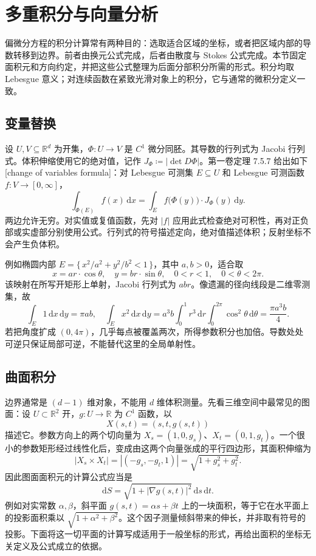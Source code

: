 \section{多重积分与向量分析}
\label{b2:sec:0102}

偏微分方程的积分计算常有两种目的：选取适合区域的坐标，或者把区域内部的导数转移到边界。前者由换元公式完成，后者由散度与 Stokes 公式完成。本节固定面积元和方向约定，并把这些公式整理为后面分部积分所需的形式。积分均取 Lebesgue 意义；对连续函数在紧致光滑对象上的积分，它与通常的微积分定义一致。

\subsection{变量替换}
\label{b2:subsec:010201}

设 \(U,V\subseteq\mathbb R^d\) 为开集，\(\Phi:U\rightarrow V\) 是 \(C^1\) 微分同胚。其导数的行列式为 Jacobi 行列式。体积伸缩使用它的绝对值，记作 \(J_\Phi\coloneqq|\det D\Phi|\)。第一卷定理 7.5.7 给出如下[change of variables formula]：对 Lebesgue 可测集 \(E\subseteq U\) 和 Lebesgue 可测函数 \(f:V\to[0,\infty]\)，
\[
 \int_{\Phi(E)}f(x)\,\mathrm dx
 =\int_E f\bigl(\Phi(y)\bigr)\cdot J_\Phi(y)\,\mathrm dy.
\]
两边允许无穷。对实值或复值函数，先对 \(|f|\) 应用此式检查绝对可积性，再对正负部或实虚部分别使用公式。行列式的符号描述定向，绝对值描述体积；反射坐标不会产生负体积。

\ProseParagraphBreak

例如椭圆内部 \(E=\{\,x^2/a^2+y^2/b^2<1\,\}\)，其中 \(a,b>0\)，适合取
\[
 x=ar\cdot\cos\theta,\quad y=br\cdot\sin\theta,
 \quad 0<r<1,\quad 0<\theta<2\pi.
\]
该映射在所写开矩形上单射，Jacobi 行列式为 \(abr\)。像遗漏的径向线段是二维零测集，故
\[
 \int_E1\,\mathrm dx\,\mathrm dy=\pi ab,
 \quad
 \int_E x^2\,\mathrm dx\,\mathrm dy
 =a^3b\int_0^1r^3\,\mathrm dr\int_0^{2\pi}\cos^2\theta\,\mathrm d\theta
 =\frac{\pi a^3b}{4}.
\]
若把角度扩成 \((0,4\pi)\)，几乎每点被覆盖两次，所得参数积分也加倍。导数处处可逆只保证局部可逆，不能替代这里的全局单射性。

\subsection{曲面积分}
\label{b2:subsec:010202}

边界通常是 \((d-1)\) 维对象，不能用 \(d\) 维体积测量。先看三维空间中最常见的图面：设 \(U\subset\mathbb R^2\) 开，\(g:U\to\mathbb R\) 为 \(C^1\) 函数，以
\[
 X(s,t)=(s,t,g(s,t))
\]
描述它。参数方向上的两个切向量为 \(X_s=(1,0,g_s)\)、\(X_t=(0,1,g_t)\)。一个很小的参数矩形经过线性化后，变成由这两个向量张成的平行四边形，其面积伸缩为
\[
 |X_s\times X_t|=|(-g_s,-g_t,1)|
 =\sqrt{1+g_s^2+g_t^2}.
\]
因此图面面积元的计算公式应当是
\[
 \mathrm dS=\sqrt{1+|\nabla g(s,t)|^2}\,\mathrm ds\,\mathrm dt.
\]
例如对实常数 \(\alpha,\beta\)，斜平面 \(g(s,t)=\alpha s+\beta t\) 上的一块面积，等于它在水平面上的投影面积乘以 \(\sqrt{1+\alpha^2+\beta^2}\)。这个因子测量倾斜带来的伸长，并非取有符号的投影。下面将这一切平面的计算写成适用于一般坐标的形式，再给出面积的坐标无关定义及公式成立的依据。

